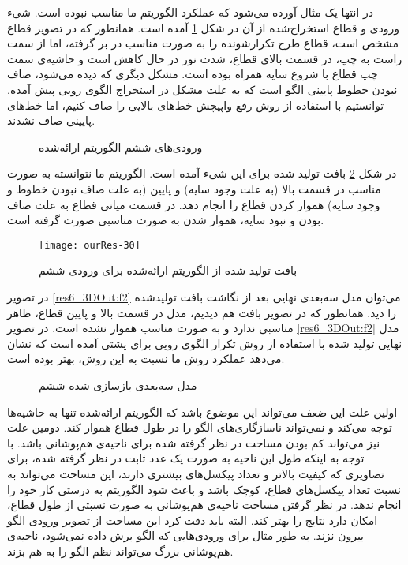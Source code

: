در انتها یک مثال آورده می‌شود که عملکرد الگوریتم ما مناسب نبوده است. شیء ورودی و قطاع استخراج‌شده از آن در شکل \ref{res6In} آمده است. همانطور که در تصویر قطاع مشخص است، قطاع طرح تکرارشونده را به صورت مناسب در بر گرفته، اما از سمت راست به چپ، در قسمت بالا‌ی قطاع، شدت نور در حال کاهش است و حاشیه‌ی سمت چپ قطاع با شروع سایه همراه بوده است. مشکل دیگری که دیده می‌شود، صاف نبودن خطوط پایینی الگو است که به علت مشکل در استخراج الگوی رویی پیش آمده. توانستیم با استفاده از روش رفع واپیچش خط‌های بالایی را صاف کنیم، اما خط‌های پایینی صاف نشدند.
\begin{figure}[h!]
	\centering
	\qquad
	\caption{ورودی‌های ششم الگوریتم ارائه‌شده}
	\label{res6In}
\end{figure}

در شکل \ref{res6Out} بافت تولید شده برای این شیء آمده است. الگوریتم ما نتوانسته به صورت مناسب در قسمت بالا (به علت وجود سایه) و پایین (به علت صاف نبودن خطوط و وجود سایه) هموار کردن قطاع را انجام دهد. در قسمت میانی قطاع به علت صاف بودن و نبود سایه، هموار شدن به صورت مناسبی صورت گرفته است.
\begin{figure}[h!]
	\centering
	\texttt{[image: ourRes-30]}
	\caption{بافت تولید شده از الگوریتم ارائه‌شده برای ورودی ششم}
	\label{res6Out}
\end{figure}

در تصویر \ref{res6_3DOut:f2} می‌توان مدل سه‌بعدی نهایی بعد از نگاشت بافت تولیدشده را دید. همانطور که در تصویر بافت هم دیدیم، مدل در قسمت بالا و پایین قطاع، ظاهر مناسبی ندارد و به صورت مناسب هموار نشده است. در تصویر \ref{res6_3DOut:f2} مدل نهایی تولید شده با استفاده از روش تکرار الگوی رویی برای پشتی آمده است که نشان می‌دهد عملکرد روش ما نسبت به این روش، بهتر بوده است.
\begin{figure}[h!]
	\centering
	\qquad
	\caption{مدل سه‌بعدی بازسازی شده ششم}
	\label{res6_3DOut}
\end{figure}

اولین علت این ضعف می‌تواند این موضوع باشد که الگوریتم ارائه‌شده تنها به حاشیه‌ها توجه می‌کند و نمی‌تواند ناسازگاری‌های الگو را در طول قطاع هموار کند. دومین علت نیز می‌تواند کم بودن مساحت در نظر گرفته شده برای ناحیه‌ی هم‌پوشانی باشد. با توجه به اینکه طول این ناحیه به صورت یک عدد ثابت در نظر گرفته شده، برای تصاویری که کیفیت بالاتر و تعداد پیکسل‌های بیشتری دارند، این مساحت می‌تواند به نسبت تعداد پیکسل‌های قطاع، کوچک باشد و باعث شود الگوریتم به درستی کار خود را انجام ندهد. در نظر گرفتن مساحت ناحیه‌ی هم‌پوشانی به صورت نسبتی از طول قطاع، امکان دارد نتایج را بهتر کند. البته باید دقت کرد این مساحت از تصویر ورودی الگو بیرون نزند. به طور مثال برای ورودی‌هایی که الگو برش‌ داده نمی‌شود، ناحیه‌ی هم‌پوشانی بزرگ می‌تواند نظم الگو را به هم بزند.

